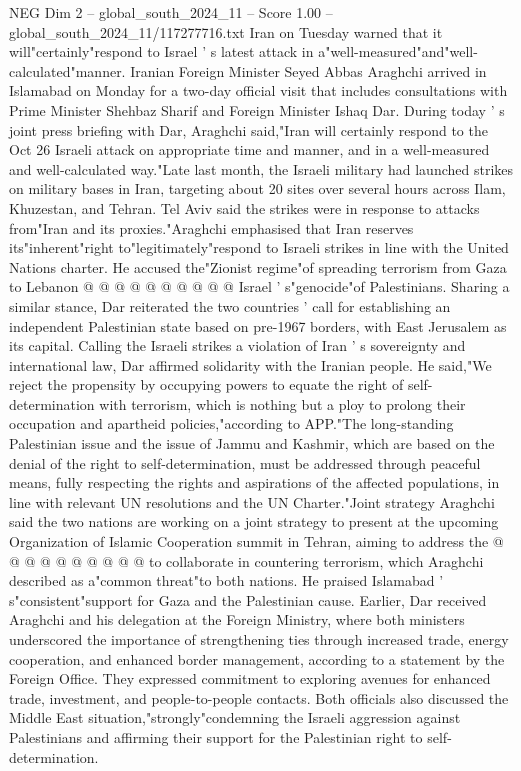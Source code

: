 \begin{textsample}{NEG Dim 2 – global\_south\_2024\_11 – Score 1.00 – global\_south\_2024\_11/117277716.txt}  \label{ex:f2_neg_206}
Iran on Tuesday warned that it will"certainly"respond to Israel ' s latest attack in a"well-measured"and"well-calculated"manner.
Iranian Foreign Minister Seyed Abbas Araghchi arrived in Islamabad on Monday for a two-day official visit that includes consultations with Prime Minister Shehbaz Sharif and Foreign Minister Ishaq Dar.
During today ' s joint press briefing with Dar, Araghchi said,"Iran will certainly respond to the Oct 26 Israeli attack on appropriate time and manner, and in a well-measured and well-calculated way."Late last month, the Israeli military had launched strikes on military bases in Iran, targeting about 20 sites over several hours across Ilam, Khuzestan, and Tehran.
Tel Aviv said the strikes were in response to attacks from"Iran and its proxies."Araghchi emphasised that Iran reserves its"inherent"right to"legitimately"respond to Israeli strikes in line with the United Nations charter.
He accused the"Zionist regime"of spreading terrorism from Gaza to Lebanon @ @ @ @ @ @ @ @ @ @ Israel ' s"genocide"of Palestinians.
Sharing a similar stance, Dar reiterated the two countries ' call for establishing an independent Palestinian state based on pre-1967 borders, with East Jerusalem as its capital.
Calling the Israeli strikes a violation of Iran ' s sovereignty and international law, Dar affirmed solidarity with the Iranian people.
He said,"We reject the propensity by occupying powers to equate the right of self-determination with terrorism, which is nothing but a ploy to prolong their occupation and apartheid policies,"according to APP."The long-standing Palestinian issue and the issue of Jammu and Kashmir, which are based on the denial of the right to self-determination, must be addressed through peaceful means, fully respecting the rights and aspirations of the affected populations, in line with relevant UN resolutions and the UN Charter."Joint strategy Araghchi said the two nations are working on a joint strategy to present at the upcoming Organization of Islamic Cooperation summit in Tehran, aiming to address the @ @ @ @ @ @ @ @ @ @ to collaborate in countering terrorism, which Araghchi described as a"common threat"to both nations.
He praised Islamabad ' s"consistent"support for Gaza and the Palestinian cause.
Earlier, Dar received Araghchi and his delegation at the Foreign Ministry, where both ministers underscored the importance of strengthening ties through increased trade, energy cooperation, and enhanced border management, according to a statement by the Foreign Office.
They expressed commitment to exploring avenues for enhanced trade, investment, and people-to-people contacts.
Both officials also discussed the Middle East situation,"strongly"condemning the Israeli aggression against Palestinians and affirming their support for the Palestinian right to self-determination.

\end{textsample}
